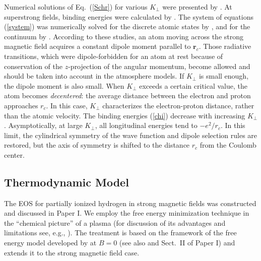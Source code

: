 \documentclass{emulateapj}
\newcommand{\req}[1]{Eq.\ (\ref{#1})}
\begin{document}
Numerical solutions of \req{Schr} for various $K_\perp$ were
presented by \citet{VDB92}. At superstrong fields, 
binding energies were calculated 
by \citet{LS95}.
The system of equations (\ref{system}) 
was numerically solved for the discrete
atomic states by \citet{P94}, and for the continuum
by \citet{PP97}. According to these studies,
an atom moving across the strong magnetic
field acquires a constant dipole moment
parallel to $\bm{r}_c$.
Those radiative transitions, which were dipole-forbidden 
for an atom at rest because of conservation 
of the $z$-projection of the angular momentum,
become allowed and should be taken into account 
in the atmosphere models.
If $K_\perp$ is small enough, the dipole moment is also small.
When $K_\perp$ exceeds a certain critical value, 
the atom becomes
\emph{decentered}: the average distance between the electron and proton
approaches $r_c$.
In this case, $K_\perp$
characterizes the electron-proton distance,
rather than the atomic velocity.
The binding energies (\ref{chi}) decrease with increasing $K_\perp$.
Asymptotically, at large $K_\perp$,
all longitudinal energies tend to $-e^2/r_c$. In this limit,
the cylindrical symmetry of the wave function and dipole
selection rules are restored, but the axis of symmetry is shifted
to the distance $r_c$ from the Coulomb center.

       \subsection{Thermodynamic Model}
\label{sect-thermomodel}
%
The EOS for partially ionized hydrogen in 
strong magnetic fields was constructed and discussed in
Paper I. We employ the free energy minimization technique
in the ``chemical picture'' of a plasma
(for discussion of its advantages and limitations
see, e.g., \citealp*{SCVH,P96b}).
The treatment is based on the framework of the free energy model
developed by \citet{SC91,SC92} at $B=0$ 
(see also \citealp{SCVH} and Sect.\ II of Paper I)
and extends it to the strong magnetic field case.
\end{document}
